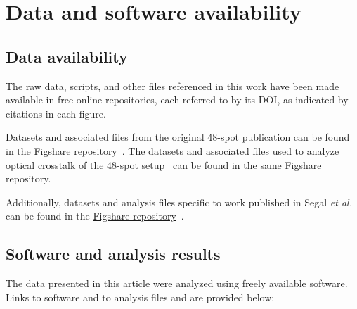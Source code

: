 \chapter{Data and software availability}
\label{chpt:data_appendix}

\section{Data availability}
\label{sec:data_and_software}

The raw data, scripts, and other files referenced in this work have been made available in free online repositories, each referred to by its DOI, as indicated by citations in each figure. 

Datasets and associated files from the original 48-spot publication can be found in the \href{https://figshare.com/articles/dataset/48-spot_smFRET-PAX_measurements_of_dsDNA_oligos/5146096}{Figshare repository}~\cite{ingargiola_JCP_2018, figshare_48-spot_2017}.
The datasets and associated files used to analyze optical crosstalk of the 48-spot setup~\cite{ingargiola_NIMA_2018} can be found in the same Figshare repository.

Additionally, datasets and analysis files specific to work published in Segal \textit{et al.} can be found in the \href{https://figshare.com/s/df2d68693bc48d625a75}{Figshare repository}~\cite{figshare_repo_2019}.

\section{Software and analysis results}

The data presented in this article were analyzed using freely available software. 
Links to software and to analysis files and are provided below:

